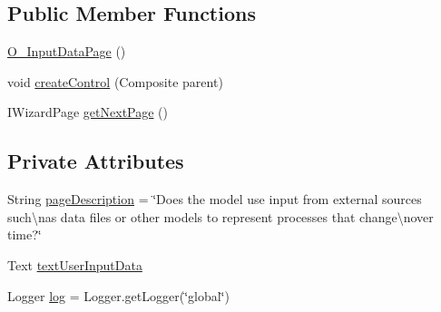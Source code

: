 \subsection*{Public Member Functions}
\begin{DoxyCompactItemize}
\item 
\hyperlink{classit_1_1isislab_1_1masonhelperdocumentation_1_1mason_1_1wizards_1_1_o___input_data_page_ab98b95c2a70953b08a088281b2e6fc46}{O\-\_\-\-Input\-Data\-Page} ()
\item 
void \hyperlink{classit_1_1isislab_1_1masonhelperdocumentation_1_1mason_1_1wizards_1_1_o___input_data_page_adf17599cd4521c39a8f1c5764e32e0b9}{create\-Control} (Composite parent)
\item 
I\-Wizard\-Page \hyperlink{classit_1_1isislab_1_1masonhelperdocumentation_1_1mason_1_1wizards_1_1_o___input_data_page_a4ef7a6a69ad85a6d7109c0874b384e8e}{get\-Next\-Page} ()
\end{DoxyCompactItemize}
\subsection*{Private Attributes}
\begin{DoxyCompactItemize}
\item 
String \hyperlink{classit_1_1isislab_1_1masonhelperdocumentation_1_1mason_1_1wizards_1_1_o___input_data_page_af9749fa490c25ae4232cd9adcb5e37c4}{page\-Description} = \char`\"{}Does the model use input from external sources such\textbackslash{}nas data files or other models to represent processes that change\textbackslash{}nover time?\char`\"{}
\item 
Text \hyperlink{classit_1_1isislab_1_1masonhelperdocumentation_1_1mason_1_1wizards_1_1_o___input_data_page_a6a991af9288d1dff741881b12f02ee84}{text\-User\-Input\-Data}
\item 
Logger \hyperlink{classit_1_1isislab_1_1masonhelperdocumentation_1_1mason_1_1wizards_1_1_o___input_data_page_adc21476c8083a27e69b68859bd664039}{log} = Logger.\-get\-Logger(\char`\"{}global\char`\"{})
\end{DoxyCompactItemize}


